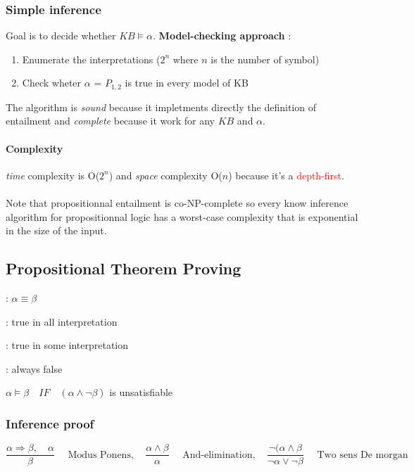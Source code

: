\subsubsection{Simple inference}
Goal is to decide whether $KB \models \alpha$. 
\textbf{Model-checking approach} :
\begin{enumerate}
    \item Enumerate the interpretations ($2^n$ where $n$ is the number of symbol)
    \item Check wheter $\alpha$ = $P_{1,2}$ is true in every model of KB
\end{enumerate}

The algorithm is \textit{sound} because it impletments directly the definition of entailment and \textit{complete} because it work for any $KB$ and $\alpha$.

\paragraph{Complexity} \textit{time} complexity is O($2^n$) and \textit{space} complexity
O($n$) because it's a \textcolor{red}{depth-first}.


\paragraph{} Note that propositionnal entailment is co-NP-complete so every know inference
algorithm for propositionnal logic has a worst-case complexity that is exponential in
the size of the input.

\subsection{Propositional Theorem Proving}

\begin{description}
    \item[Logical equivalence] : $\alpha \equiv \beta$
    \item[Valid] : true in all interpretation
    \item[Satisfiable] : true in some interpretation
    \item[Unsatisfiable/Inconsistency] : always false
    \item $\alpha \models \beta \quad IF \quad (\alpha \wedge \neg \beta)$ is unsatisfiable
\end{description}

\subsubsection{Inference proof}
$$ \frac{\alpha \Rightarrow \beta, \quad \alpha}{\beta} \quad \textrm{ Modus Ponens}, \quad
\frac{\alpha \wedge \beta}{\alpha} \quad \textrm{ And-elimination}, \quad
\frac{\neg (\alpha \wedge \beta}{\neg \alpha \vee \neg \beta} \quad \textrm{ Two sens De morgan}$$

